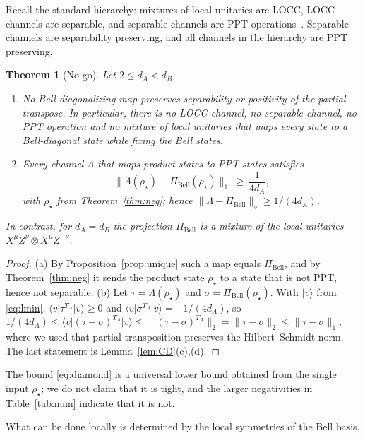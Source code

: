 \documentclass[11pt,a4paper]{article}
\newtheorem{theorem}{Theorem}
\theoremstyle{definition}
\theoremstyle{remark}
\newcommand{\ket}[1]{\lvert #1\rangle}
\newcommand{\bra}[1]{\langle #1\rvert}
\newcommand{\dA}{d_A}
\newcommand{\dB}{d_B}
\newcommand{\PiB}{\Pi_{\mathrm{Bell}}}
\begin{document}
Recall the standard hierarchy: mixtures of local unitaries are LOCC, LOCC channels are
separable, and separable channels are PPT operations~\cite{Rains01,CLMOW14}. Separable
channels are separability preserving, and all channels in the hierarchy are PPT
preserving.

\begin{theorem}[No-go]\label{thm:nogo}
Let $2\le\dA<\dB$.
\begin{enumerate}
\item[(a)] No Bell-diagonalizing map preserves separability or positivity of the partial
transpose. In particular, there is no LOCC channel, no separable channel, no PPT
operation and no mixture of local unitaries that maps every state to a Bell-diagonal
state while fixing the Bell states.
\item[(b)] Every channel $\Lambda$ that maps product states to PPT states satisfies
\begin{equation}\label{eq:diamond}
\bigl\|\Lambda(\rho_\star)-\PiB(\rho_\star)\bigr\|_1\ \ge\ \frac{1}{4\dA},
\end{equation}
with $\rho_\star$ from Theorem~\ref{thm:neg}; hence
$\|\Lambda-\PiB\|_\diamond\ge 1/(4\dA)$.
\end{enumerate}
In contrast, for $\dA=\dB$ the projection $\PiB$ is a mixture of the local unitaries
$X^{\mu}Z^{\nu}\otimes X^{\mu}Z^{-\nu}$.
\end{theorem}

\begin{proof}
(a) By Proposition~\ref{prop:unique} such a map equals $\PiB$, and by
Theorem~\ref{thm:neg} it sends the product state $\rho_\star$ to a state that is not PPT,
hence not separable. (b) Let $\tau=\Lambda(\rho_\star)$ and $\sigma=\PiB(\rho_\star)$. With
$\ket v$ from \eqref{eq:lmin}, $\bra v\tau^{T_A}\ket v\ge0$ and
$\bra v\sigma^{T_A}\ket v=-1/(4\dA)$, so
$1/(4\dA)\le\bra v(\tau-\sigma)^{T_A}\ket v\le\|(\tau-\sigma)^{T_A}\|_2=\|\tau-\sigma\|_2
\le\|\tau-\sigma\|_1$, where we used that partial transposition preserves the
Hilbert--Schmidt norm. The last statement is Lemma~\ref{lem:CD}(c),(d).
\end{proof}

The bound \eqref{eq:diamond} is a universal lower bound obtained from the single input
$\rho_\star$; we do not claim that it is tight, and the larger negativities in
Table~\ref{tab:num} indicate that it is not.

What can be done locally is determined by the local symmetries of the Bell basis.
\end{document}

